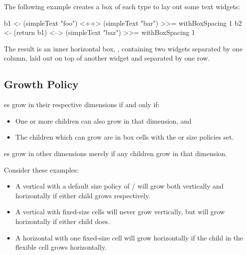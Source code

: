 The following example creates a box of each type to lay out some text
widgets:

\begin{haskellcode}
 b1 <- (simpleText "foo") <++> (simpleText "bar") >>= withBoxSpacing 1
 b2 <- (return b1) <--> (simpleText "baz") >>= withBoxSpacing 1
\end{haskellcode}

The result is an inner horizontal box, , containing two
 widgets separated by one column, laid out on top of
another  widget and separated by one row.

\subsection{Growth Policy}

es grow in their respective dimensions if and only if:

\begin{itemize}
\item One or more children can also grow in that dimension, and
\item The children which can grow are in box cells with the
   or  size policies set.
\end{itemize}

es grow in other dimensions merely if any children grow in
that dimension.

Consider these examples:

\begin{itemize}
\item A vertical  with a default size policy of  /
   will grow both vertically and horizontally if either
  child grows respectively.
\item A vertical  with fixed-size cells will never grow
  vertically, but will grow horizontally if either child does.
\item A horizontal  with one fixed-size cell will grow
  horizontally if the child in the flexible cell grows horizontally.
\end{itemize}
